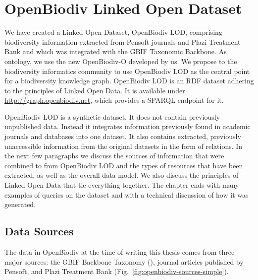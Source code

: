 \chapter{OpenBiodiv Linked Open Dataset}
\label{chapter-lod}

We have created a Linked Open Dataset, OpenBiodiv LOD, comprising biodiversity information extracted from Pensoft journals and Plazi Treatment Bank and which was integrated with the GBIF Taxonomic Backbone. As ontology, we use the new \mbox{OpenBiodiv-O} developed by us. We propose to the biodiversity informatics community to use OpenBiodiv LOD as the central point for a biodiversity knowledge graph. OpenBiodiv LOD is an RDF dataset adhering to the principles of Linked Open Data. It is available under \url{http://graph.openbiodiv.net}, which provides a SPARQL endpoint for it.

OpenBiodiv LOD is a synthetic dataset. It does not contain previously unpublished data. Instead it integrates information previously found in academic journals and databases into one dataset. It also contains  extracted, previously unaccessible information from the original datasets in the form of relations. In the next few paragraphs we discuss the sources of information that were combined to from OpenBiodiv LOD and the types of resources that have been extracted, as well as the overall data model. We also discuss the principles of Linked Open Data that tie everything together. The chapter ends with many examples of queries on the dataset and with a technical discussion of how it was generated.

\section{Data Sources}

The data in OpenBiodiv at the time of writing this thesis comes from three major sources: the GBIF Backbone Taxonomy (\cite{gbif_secretariat_gbif_2017-1}), journal articles published by Pensoft, and Plazi Treatment Bank (Fig.~\ref{fig:openbiodiv-sources-simple}).

